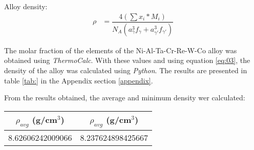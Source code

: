 \clearpage
\section{}

Alloy density:
\begin{align}
    \label{eq:03}
    \rho &= \dfrac{4(\sum x_i * M_i)}{N_A\left(a_{\gamma}^3f_\gamma+a_{\gamma'}^3f_{\gamma'}\right)}
\end{align}

The molar fraction of the elements of the Ni-Al-Ta-Cr-Re-W-Co alloy was obtained using \textit{ThermoCalc}. With these values and using equation \ref{eq:03}, the density of the alloy was calculated using \textit{Python}. The results are presented in table \ref{tab:} in the Appendix section \ref{appendix}.

From the results obtained, the average and minimum density wer calculated:

\begin{table}
    \centering
    \begin{tabular}{cc}
        $\rho_{avg}$ (g/cm$^3$) & $\rho_{avg}$ (g/cm$^3$) \\ \hline \hline
        8.62606242009066 & 8.237624898425667
    \end{tabular}
\end{table}
